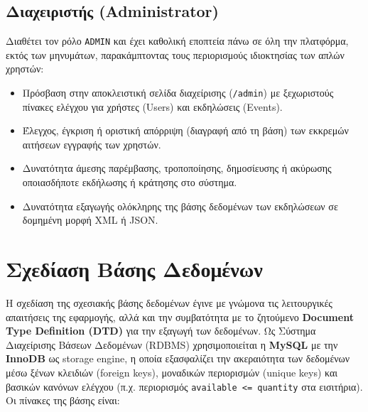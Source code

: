 \documentclass[12pt]{fphw}
\newcommand{\en}[1]{\foreignlanguage{english}{#1}}
\begin{document}
\subsection{Διαχειριστής (\en{Administrator})}
Διαθέτει τον ρόλο \en{\texttt{ADMIN}} και έχει καθολική εποπτεία πάνω σε όλη την πλατφόρμα, εκτός των μηνυμάτων, παρακάμπτοντας τους περιορισμούς ιδιοκτησίας των απλών χρηστών:
\begin{itemize}[leftmargin=*]
    \item Πρόσβαση στην αποκλειστική σελίδα διαχείρισης (\en{\texttt{/admin}}) με ξεχωριστούς πίνακες ελέγχου για χρήστες (\en{Users}) και εκδηλώσεις (\en{Events}).
    \item Έλεγχος, έγκριση ή οριστική απόρριψη (διαγραφή από τη βάση) των εκκρεμών αιτήσεων εγγραφής των χρηστών.
    \item Δυνατότητα άμεσης παρέμβασης, τροποποίησης, δημοσίευσης ή ακύρωσης οποιασδήποτε εκδήλωσης ή κράτησης στο σύστημα.
    \item Δυνατότητα εξαγωγής ολόκληρης της βάσης δεδομένων των εκδηλώσεων σε δομημένη μορφή \en{XML} ή \en{JSON}.
\end{itemize}

\newpage

\section{Σχεδίαση Βάσης Δεδομένων}
Η σχεδίαση της σχεσιακής βάσης δεδομένων έγινε με γνώμονα τις λειτουργικές απαιτήσεις της εφαρμογής, αλλά και την συμβατότητα με το ζητούμενο \en{\textbf{Document Type Definition (DTD)}} για την εξαγωγή των δεδομένων. Ως Σύστημα Διαχείρισης Βάσεων Δεδομένων (\en{RDBMS}) χρησιμοποιείται η \en{\textbf{MySQL}} με την \textbf{InnoDB} ως \en{storage engine}, η οποία εξασφαλίζει την ακεραιότητα των δεδομένων μέσω ξένων κλειδιών (\en{foreign keys}), μοναδικών περιορισμών (\en{unique keys}) και βασικών κανόνων ελέγχου (π.χ. περιορισμός \en{\texttt{available <= quantity}} στα εισιτήρια). Οι πίνακες της βάσης είναι:
\end{document}
